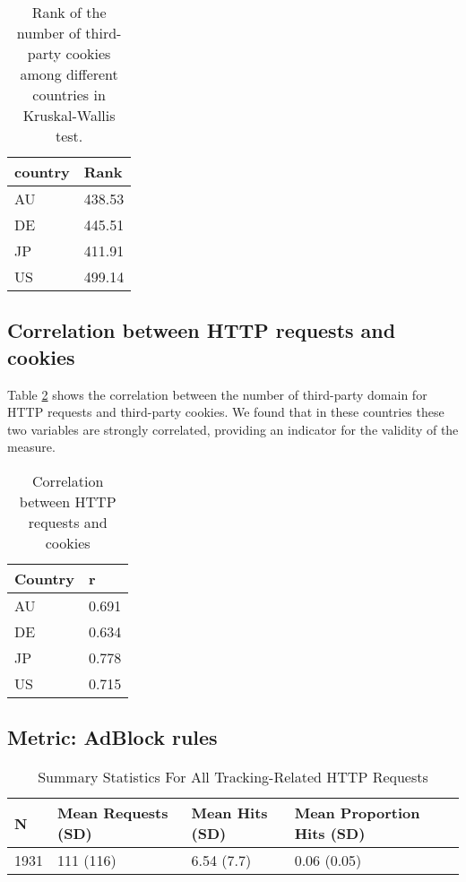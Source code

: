 \documentclass[journal]{IEEEtran}
\begin{document}
\begin{table}[t]
\centering
\caption{Rank of the number of third-party cookies among different countries in Kruskal-Wallis test.}
\label{thirdcookie}
\begin{tabular}{|l|l|}
\hline
\textbf{country} & \textbf{Rank} \\ \hline
AU               & 438.53        \\ \hline
DE               & 445.51        \\ \hline
JP               & 411.91        \\ \hline
US               & 499.14        \\ \hline
\end{tabular}
\end{table}


\subsection{Correlation between HTTP requests and cookies}
Table \ref{correlation} shows the correlation between the number of third-party domain for HTTP requests and third-party cookies. We found that in these countries these two variables are strongly correlated, providing an indicator for the validity of the measure.

\begin{table}[t]
\centering
\caption{Correlation between HTTP requests and cookies}
\label{correlation}
\begin{tabular}{|l|l|}
\hline
\textbf{Country} & \textbf{r} \\ \hline
AU               & 0.691      \\ \hline
DE               & 0.634      \\ \hline
JP               & 0.778      \\ \hline
US               & 0.715   \\  \hline
\end{tabular}
\end{table}


\subsection{Metric: AdBlock rules}

\begin{table*}[t]
\centering
\caption{Summary Statistics For All Tracking-Related HTTP Requests}
\label{summaryTracking}
\begin{tabular}{|l|l|l|l|}
\hline
\textbf{N} & \textbf{Mean Requests (SD)} & \textbf{Mean Hits (SD)} & \textbf{Mean Proportion Hits (SD)} \\ \hline
1931       & 111 (116)                   & 6.54 (7.7)              & 0.06 (0.05)                        \\ \hline
\end{tabular}
\end{table*}
\end{document}
